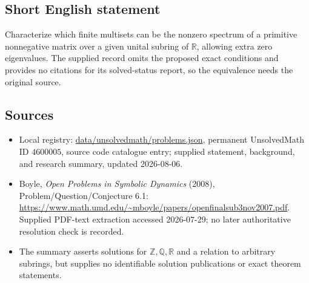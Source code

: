 \documentclass[11pt]{article}
\begin{document}
\subsection{Short English statement}
Characterize which finite multisets can be the nonzero spectrum of a primitive nonnegative matrix over a given unital subring of \(\mathbb R\), allowing extra zero eigenvalues. The supplied record omits the proposed exact conditions and provides no citations for its solved-status report, so the equivalence needs the original source.
\subsection{Sources}
\begin{itemize}
\item Local registry: \url{data/unsolvedmath/problems.json}, permanent UnsolvedMath ID \(4600005\), source code catalogue entry; supplied statement, background, and research summary, updated 2026-08-06.
\item Boyle, \emph{Open Problems in Symbolic Dynamics} (2008), Problem/Question/Conjecture 6.1: \url{https://www.math.umd.edu/~mboyle/papers/openfinalsub3nov2007.pdf}. Supplied PDF-text extraction accessed 2026-07-29; no later authoritative resolution check is recorded.
\item The summary asserts solutions for \(\mathbb Z,\mathbb Q,\mathbb R\) and a relation to arbitrary subrings, but supplies no identifiable solution publications or exact theorem statements.
\end{itemize}
\end{document}
